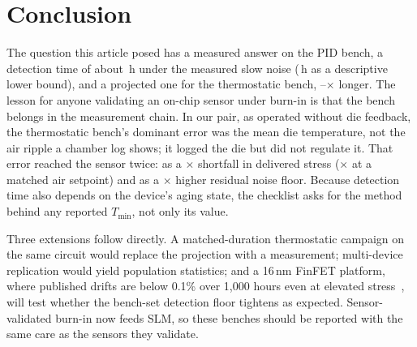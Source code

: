 \documentclass[10pt,twocolumn]{article}
\newcommand{\Tmin}{T_{\min}}
\begin{document}
\section{Conclusion}

The question this article posed has a measured answer on the PID bench, a detection time of about \vTminLrv\,h under the measured slow noise (\vTminSeq\,h as a descriptive lower bound), and a projected one for the thermostatic bench, \vPenLow--\vPenHigh$\times$ longer. The lesson for anyone validating an on-chip sensor under burn-in is that the bench belongs in the measurement chain. In our pair, as operated without die feedback, the thermostatic bench's dominant error was the mean die temperature, not the air ripple a chamber log shows; it logged the die but did not regulate it. That error reached the sensor twice: as a \vAFratio$\times$ shortfall in delivered stress (\vAFratioSPadj$\times$ at a matched air setpoint) and as a \vSigRawRatio$\times$ higher residual noise floor. Because detection time also depends on the device's aging state, the checklist asks for the method behind any reported $\Tmin$, not only its value.

Three extensions follow directly. A matched-duration thermostatic campaign on the same circuit would replace the projection with a measurement; multi-device replication would yield population statistics; and a 16\,nm FinFET platform, where published drifts are below 0.1\% over 1,000 hours even at elevated stress~\cite{sobas}, will test whether the bench-set detection floor tightens as expected. Sensor-validated burn-in now feeds SLM, so these benches should be reported with the same care as the sensors they validate.
\end{document}
